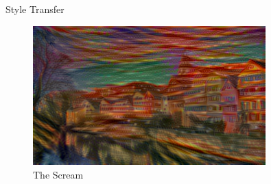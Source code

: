 \documentclass{beamer}
\begin{document}
\begin{frame}{Style Transfer}
{\begin{figure}[ht]
    \end{figure}
}{
    \begin{figure}[ht]
    \centering
    \caption*{The Scream}
    \includegraphics[width=0.8\textwidth]{img/transfer/scream}
    \end{figure}
}
\end{frame}
\end{document}
